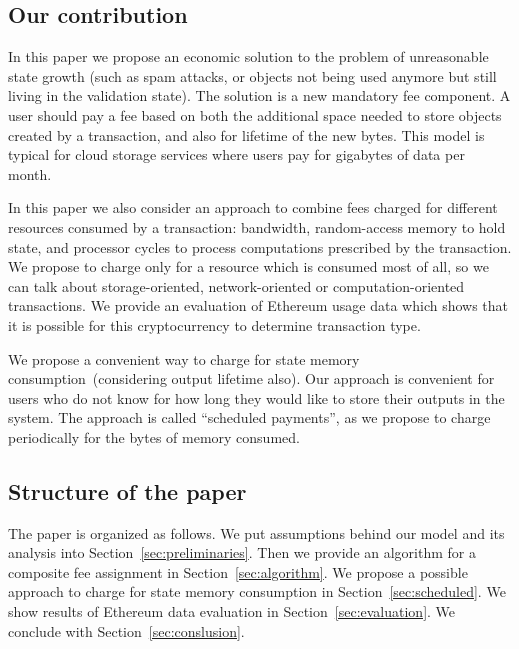 \documentclass[]{llncs}   %
\begin{document}
\subsection{Our contribution}

In this paper we propose an economic solution to the problem of unreasonable state growth
(such as spam attacks, or objects not being used anymore but still living in
the validation state). The solution is a new mandatory fee component. A 
user should pay a fee based on both the additional space needed to store objects
created by a transaction, and also for lifetime of the new bytes. This model is
typical for cloud storage services where users pay for gigabytes of data per
month. 

In this paper we also consider an approach to combine fees charged for different resources consumed by a transaction:
bandwidth, random-access memory to hold state, and processor cycles to process computations prescribed by the transaction.    
We propose to charge only for a resource which is consumed most of all, so we can talk about storage-oriented,
network-oriented or computation-oriented transactions. We provide an evaluation of Ethereum usage data which shows
that it is possible for this cryptocurrency to determine transaction type.

We propose a convenient way to charge for state memory consumption~(considering output lifetime also).
Our approach is convenient for users who do not know for how long they would like to store their
outputs in the system. The approach is called ``scheduled payments'', as we propose to charge periodically
for the bytes of memory consumed.






\subsection{Structure of the paper}
The paper is organized as follows. We put assumptions behind our model and its analysis into Section~\ref{sec:preliminaries}. Then we provide an algorithm for a composite fee assignment in Section~\ref{sec:algorithm}. We propose a possible approach to charge for state memory consumption in Section~\ref{sec:scheduled}. We show results of Ethereum data evaluation in Section~\ref{sec:evaluation}. We conclude with Section~\ref{sec:conslusion}.
\end{document}
